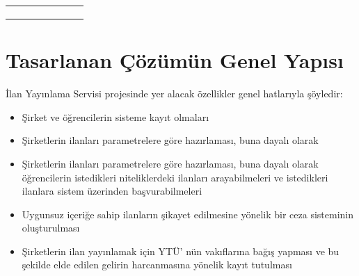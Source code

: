 \begin{table}[]
{\begin{tabular}{ccccccc}
\multicolumn{1}{l}{}     & \multicolumn{1}{l}{}                                                                                                  & \multicolumn{1}{l}{}                                                               & \multicolumn{1}{l}{}                                                                 & \multicolumn{1}{l}{}                                                                                           & \multicolumn{1}{l}{}                                                          & \multicolumn{1}{l}{}                                                                      \\
\multicolumn{1}{l}{}     & \multicolumn{1}{l}{}                                                                                                  & \multicolumn{1}{l}{}                                                               & \multicolumn{1}{l}{}                                                                 & \multicolumn{1}{l}{}                                                                                           & \multicolumn{1}{l}{}                                                          & \multicolumn{1}{l}{}                                                                      \\
\multicolumn{1}{l}{}     & \multicolumn{1}{l}{}                                                                                                  & \multicolumn{1}{l}{}                                                               & \multicolumn{1}{l}{}                                                                 & \multicolumn{1}{l}{}                                                                                           & \multicolumn{1}{l}{}                                                          & \multicolumn{1}{l}{}                                                                     
\end{tabular}%
}
\end{table}



\section{Tasarlanan Çözümün Genel Yapısı}

İlan Yayınlama Servisi projesinde yer alacak özellikler genel hatlarıyla şöyledir:
\begin{itemize}
    \item Şirket ve öğrencilerin sisteme kayıt olmaları
    \item Şirketlerin ilanları parametrelere göre hazırlaması, buna dayalı olarak
    \item Şirketlerin ilanları parametrelere göre hazırlaması, buna dayalı olarak
öğrencilerin istedikleri niteliklerdeki ilanları arayabilmeleri ve istedikleri
ilanlara sistem üzerinden başvurabilmeleri
    \item Uygunsuz içeriğe sahip ilanların şikayet edilmesine yönelik bir ceza sisteminin
oluşturulması
    \item Şirketlerin ilan yayınlamak için YTÜ’ nün vakıflarına bağış yapması ve bu şekilde elde edilen gelirin
harcanmasına yönelik kayıt tutulması
\end{itemize}

